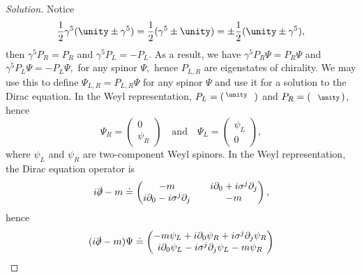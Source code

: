 \begin{proof}[Solution]
   Notice 
   \begin{equation*}
       \frac12 \gamma^5 (\unity \pm \gamma^5) = \frac12 (\gamma^5  \pm \unity) = \pm \frac12 (\unity \pm \gamma^5),
   \end{equation*}
   then \(\gamma^5 P_{R} = P_R\) and \(\gamma^5 P_L = -P_L\). As a result, we have \(\gamma^5 P_{R} \Psi = P_R \Psi\) and \(\gamma^5 P_L \Psi = - P_L \Psi,\) for any spinor \(\Psi,\) hence \(P_{L,R}\) are eigenstates of chirality. We may use this to define \(\Psi_{L,R} = P_{L,R} \Psi\) for any spinor \(\Psi\) and use it for a solution to the Dirac equation. In the Weyl representation, \(P_L = \left(\begin{smallmatrix} \unity &&\\&& \end{smallmatrix}\right)\) and \(P_R = \left(\begin{smallmatrix} &&\\&& \unity\end{smallmatrix}\right)\), hence 
   \begin{equation*}
       \Psi_R = \begin{pmatrix}
           0\\
           \psi_R
       \end{pmatrix}
       \quad\text{and}\quad
       \Psi_L = \begin{pmatrix}
           \psi_L\\
           0
       \end{pmatrix},
   \end{equation*}
   where \(\psi_L\) and \(\psi_R\) are two-component Weyl spinors. In the Weyl representation, the Dirac equation operator is 
   \begin{equation*}
       i\slashed{\partial} - m \doteq \begin{pmatrix}
          -m && i \partial_0 + i \sigma^j \partial_j\\
          i \partial_0 - i \sigma^j \partial_j && -m
       \end{pmatrix},
   \end{equation*}
   hence
   \begin{equation*}
      (i \slashed{\partial} - m)\Psi \doteq \begin{pmatrix}
          -m \psi_L + i \partial_0 \psi_R + i \sigma^j \partial_j \psi_R\\
          i \partial_0 \psi_L - i \sigma^j \partial_j \psi_L - m \psi_R
      \end{pmatrix}
   \end{equation*}

\end{proof}
